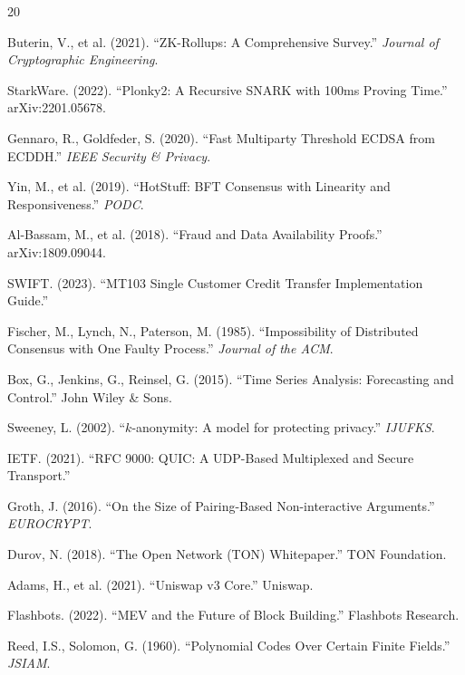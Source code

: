 \documentclass[12pt,a4paper]{article}
\theoremstyle{definition}
\theoremstyle{remark}
\begin{document}
\begin{thebibliography}{20}

Buterin, V., et al. (2021). ``ZK-Rollups: A Comprehensive Survey.'' \textit{Journal of Cryptographic Engineering}.

StarkWare. (2022). ``Plonky2: A Recursive SNARK with 100ms Proving Time.'' arXiv:2201.05678.

Gennaro, R., Goldfeder, S. (2020). ``Fast Multiparty Threshold ECDSA from ECDDH.'' \textit{IEEE Security \& Privacy}.

Yin, M., et al. (2019). ``HotStuff: BFT Consensus with Linearity and Responsiveness.'' \textit{PODC}.

Al-Bassam, M., et al. (2018). ``Fraud and Data Availability Proofs.'' arXiv:1809.09044.

SWIFT. (2023). ``MT103 Single Customer Credit Transfer Implementation Guide.''

Fischer, M., Lynch, N., Paterson, M. (1985). ``Impossibility of Distributed Consensus with One Faulty Process.'' \textit{Journal of the ACM}.

Box, G., Jenkins, G., Reinsel, G. (2015). ``Time Series Analysis: Forecasting and Control.'' John Wiley \& Sons.

Sweeney, L. (2002). ``$k$-anonymity: A model for protecting privacy.'' \textit{IJUFKS}.

IETF. (2021). ``RFC 9000: QUIC: A UDP-Based Multiplexed and Secure Transport.''

Groth, J. (2016). ``On the Size of Pairing-Based Non-interactive Arguments.'' \textit{EUROCRYPT}.

Durov, N. (2018). ``The Open Network (TON) Whitepaper.'' TON Foundation.

Adams, H., et al. (2021). ``Uniswap v3 Core.'' Uniswap.

Flashbots. (2022). ``MEV and the Future of Block Building.'' Flashbots Research.

Reed, I.S., Solomon, G. (1960). ``Polynomial Codes Over Certain Finite Fields.'' \textit{JSIAM}.

\end{thebibliography}
\end{document}
